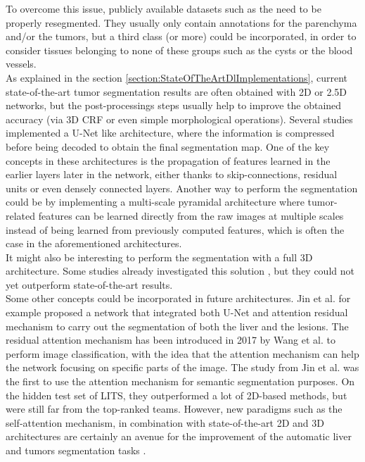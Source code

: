 To overcome this issue, publicly available datasets such as the
 need to be properly resegmented. They usually only contain
annotations for the parenchyma and/or the tumors, but a third class (or
more) could be incorporated, in order to consider tissues belonging to none of
these groups such as the cysts or the blood vessels.\\
As explained in the section  \ref{section:StateOfTheArtDlImplementations}, current state-of-the-art tumor
segmentation results are often obtained with 2D or 2.5D networks, but
the post-processings steps usually help to improve the obtained accuracy
(via 3D CRF or even simple morphological operations). Several studies
implemented a U-Net like architecture, where the information is
compressed before being decoded to obtain the final segmentation map.
One of the key concepts in these architectures is the propagation of
features learned in the earlier layers later in the network, either
thanks to skip-connections, residual units or even densely connected
layers. Another way to perform the segmentation could be by implementing a
multi-scale pyramidal architecture where tumor-related features can be
learned directly from the raw images at multiple scales instead of being
learned from previously computed features, which is often the case in
the aforementioned architectures.\\
It might also be interesting to perform the segmentation with a full 3D
architecture. Some studies already investigated this solution \cite{Dou2016}, 
but they could not yet outperform state-of-the-art results. \\
Some other concepts could be incorporated in future architectures. Jin et
al. \cite{Jin2018} for example proposed a network that integrated both U-Net and
attention residual mechanism to carry out the segmentation of both the
liver and the lesions. The residual attention mechanism has been
introduced in 2017 by Wang et al. \cite{Wang2017} to perform image
classification, with the idea that the attention mechanism can help the
network focusing on specific parts of the image. The study from Jin et
al. was the first to use the attention mechanism for
semantic segmentation purposes. On the hidden test set of LITS, they
outperformed a lot of 2D-based methods, but were still far from the
top-ranked teams. However, new paradigms such as the self-attention
mechanism, in combination with state-of-the-art 2D and 3D architectures
are certainly an avenue for the improvement of the automatic liver and
tumors segmentation tasks \cite{Chen2019}.

